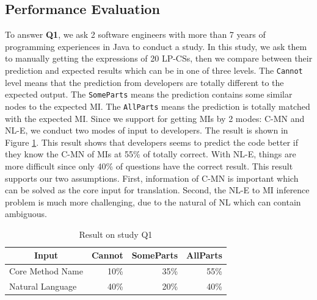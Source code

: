 \documentclass[sigconf,review,anonymous]{article}
\begin{document}
\subsection{Performance Evaluation}
To answer \textbf{Q1}, we ask 2 software engineers with more than 7 years of programming experiences in Java to conduct a study. In this study, we ask them to manually getting the expressions of 20 LP-CSs, then we compare between their prediction and expected results which can be in one of three levels. The \texttt{Cannot} level means that the prediction from developers are totally different to the expected output. The \texttt{SomeParts} means the prediction contains some similar nodes to the expected MI. The \texttt{AllParts} means the prediction is totally matched with the expected MI. Since we support for getting MIs by 2 modes: C-MN and NL-E, we conduct two modes of input to developers. The result is shown in Figure \ref{tbl:StudyQ1}. This result shows that developers seems to predict the code better if they know the C-MN of MIs at 55\% of totally correct. With NL-E, things are more difficult since only 40\% of questions have the correct result. This result supports our two assumptions. First, information of C-MN is important which can be solved as the core input for translation. Second, the NL-E to MI inference problem is much more challenging, due to the natural of NL which can contain ambiguous.

\begin{table}[]
\caption{Result on study Q1}
\label{tbl:StudyQ1}
\centering
\begin{tabular}{|l|r|r|r|}
\hline
\multicolumn{1}{|c|}{\textbf{Input}} & \multicolumn{1}{l|}{\textbf{Cannot}} & \multicolumn{1}{l|}{\textbf{SomeParts}} & \multicolumn{1}{l|}{\textbf{AllParts}} \\ \hline
Core Method Name                     & 10\%                                 & 35\%                                    & 55\%                                   \\ \hline
Natural Language                     & 40\%                                 & 20\%                                    & 40\%                                   \\ \hline
\end{tabular}
\end{table}
\end{document}
